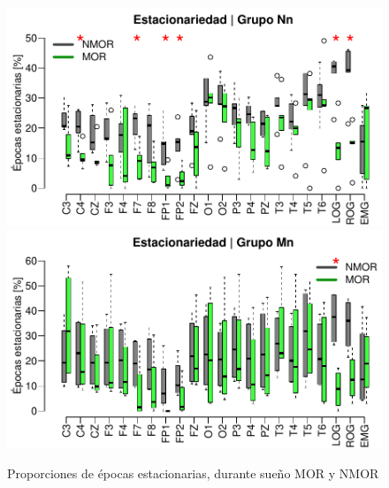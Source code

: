 \begin{figure}
\centering
\includegraphics[width=\linewidth]
{./img_ejemplos/Comparacion_etapas_normal_MOR_vs_NMOR_v2.pdf} \\
\includegraphics[width=\linewidth]
{./img_ejemplos/Comparacion_etapas_pdc_MOR_vs_NMOR_v2.pdf} \\
\caption{Proporciones de épocas estacionarias, durante sueño MOR y NMOR}
\label{comparacion_verde}
\end{figure}

